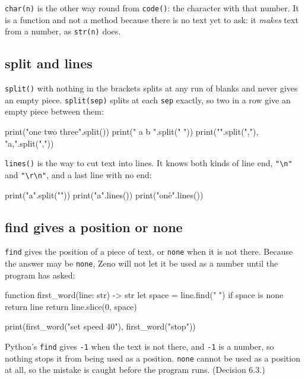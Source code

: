 \verb|char(n)| is the other way round from \verb|code()|: the
character with that number. It is a function and not a method because
there is no text yet to ask: it \emph{makes} text from a number, as
\verb|str(n)| does.

\subsection{split and lines}

\verb|split()| with nothing in the brackets splits at any run of blanks
and never gives an empty piece. \verb|split(sep)| splits at each
\verb|sep| exactly, so two in a row give an empty piece between them:

\begin{zeno}
print("one  two   three".split())
print("  a b ".split(" "))
print("".split(","), "a,".split(","))
\end{zeno}

\verb|lines()| is the way to cut text into lines. It knows both kinds
of line end, \verb|"\n"| and \verb|"\r\n"|, and a last line with no end:

\begin{zeno}
print("a\nb\n".split("\n"))
print("a\nb\n".lines())
print("one\r\ntwo".lines())
\end{zeno}

\subsection{find gives a position or none}

\verb|find| gives the position of a piece of text, or \verb|none| when
it is not there. Because the answer may be \verb|none|, Zeno will not
let it be used as a number until the program has asked:

\begin{zeno}
function first_word(line: str) -> str {
    let space = line.find(" ")
    if space is none {
        return line
    }
    return line.slice(0, space)
}

print(first_word("set speed 40"), first_word("stop"))
\end{zeno}

\begin{why}
Python's \verb|find| gives \verb|-1| when the text is not there, and
\verb|-1| is a number, so nothing stops it from being used as a
position. \verb|none| cannot be used as a position at all, so the
mistake is caught before the program runs. (Decision 6.3.)
\end{why}

